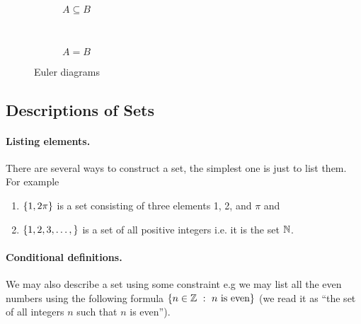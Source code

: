 \begin{figure}
    \centering
    \begin{subfigure}[b]{0.45\textwidth}
      \begin{center}
      \end{center}
      \caption{$A \subseteq B$}
      \label{figure:euler-diagram-subset}
    \end{subfigure}
    ~
    \begin{subfigure}[b]{0.45\textwidth}
      \begin{center}
      \end{center}
      \caption{$A = B$}
      \label{figure:euler-diagram-equal}
    \end{subfigure}
    \caption{Euler diagrams}
    \label{figure:euler-diagram}
\end{figure}


\subsection{Descriptions of Sets}

\paragraph{Listing elements.} There are several ways to construct a set, the
simplest one is just to list them. For example
\begin{enumerate}
  \item $\set{1, 2 \pi}$ is a set consisting of three elements 1, 2, and $\pi$
    and
  \item $\set{1, 2, 3, \dots, }$ is a set of all positive integers i.e. it is
    the set $\mathbb{N}$.
\end{enumerate}

\paragraph{Conditional definitions.}
We may also describe a set using some constraint e.g we may list all the even
numbers using the following formula $\set[n \text{ is even}]{n \in \Z}$
(we read it as ``the set of all integers $n$ such that $n$ is even'').

